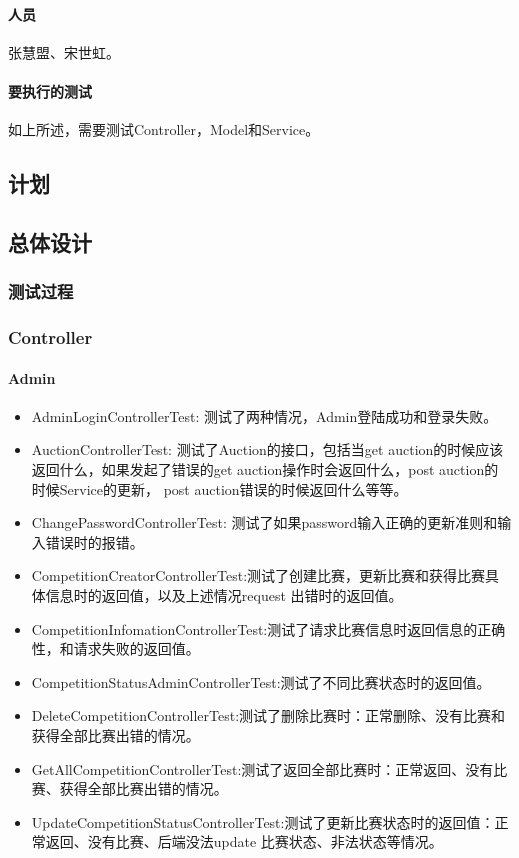 \documentclass{article}
\begin{document}
\paragraph{人员}
	张慧盟、宋世虹。
\paragraph{要执行的测试}
	如上所述，需要测试Controller，Model和Service。
\subsection{计划}
\subsection{总体设计}
\subsubsection{测试过程}
	\subsubsection{Controller}
		\paragraph{Admin}
			\begin{itemize}
			\item AdminLoginControllerTest: 测试了两种情况，Admin登陆成功和登录失败。
			\item AuctionControllerTest: 测试了Auction的接口，包括当get auction的时候应该返回什么，如果发起了错误的get auction操作时会返回什么，post auction的时候Service的更新， post auction错误的时候返回什么等等。
			\item ChangePasswordControllerTest: 测试了如果password输入正确的更新准则和输入错误时的报错。
			\item CompetitionCreatorControllerTest:测试了创建比赛，更新比赛和获得比赛具体信息时的返回值，以及上述情况request 出错时的返回值。
			\item CompetitionInfomationControllerTest:测试了请求比赛信息时返回信息的正确性，和请求失败的返回值。
			\item CompetitionStatusAdminControllerTest:测试了不同比赛状态时的返回值。
			\item DeleteCompetitionControllerTest:测试了删除比赛时：正常删除、没有比赛和获得全部比赛出错的情况。
			\item GetAllCompetitionControllerTest:测试了返回全部比赛时：正常返回、没有比赛、获得全部比赛出错的情况。
			\item UpdateCompetitionStatusControllerTest:测试了更新比赛状态时的返回值：正常返回、没有比赛、后端没法update 比赛状态、非法状态等情况。
			\end{itemize}
\end{document}
